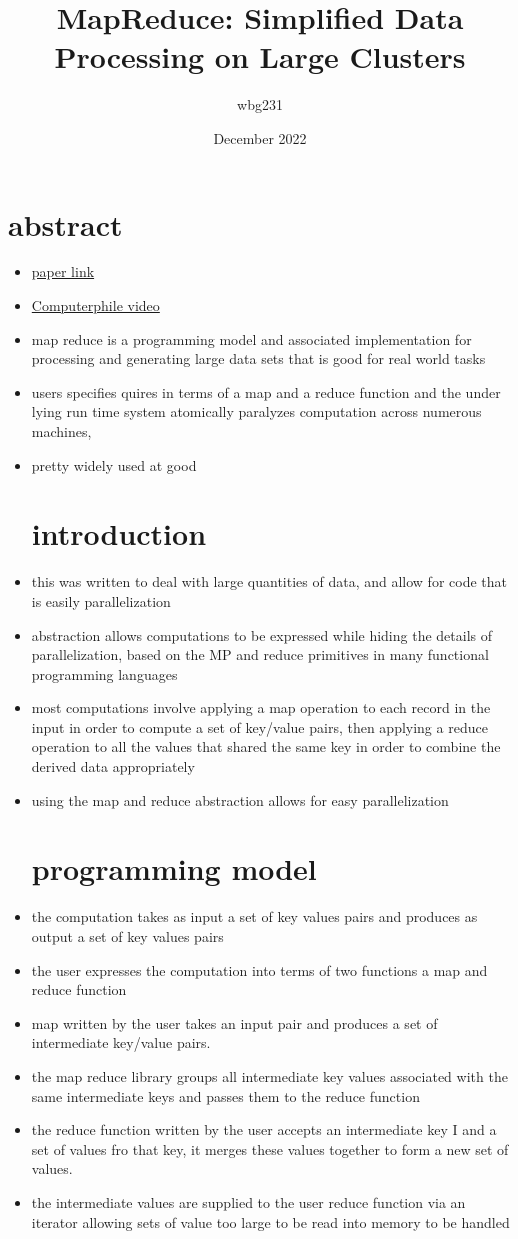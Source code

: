 \documentclass{article}
\title{MapReduce: Simplified Data Processing
on Large Clusters}
\author{wbg231 }
\date{December 2022}
\begin{document}
\maketitle

\section*{abstract}
\begin{itemize}
\item \href{https://brightspace.nyu.edu/content/enforced/261985-SP23_DS-GA_1004_1_001/p107-dean.pdf}{paper link}
\item \href{https://www.youtube.com/watch?v=cvhKoniK5Uo}{Computerphile video }
\item map reduce is a programming model and associated implementation for processing and generating large data sets that is good for real world tasks
\item users specifies quires in terms of a map and a reduce function and the under lying run time system atomically paralyzes computation across numerous machines, 
\item pretty widely used at good 
\section{introduction}
\item this was written to deal with large quantities of data, and allow for code that is easily parallelization 
\item abstraction allows computations to be expressed while hiding the details of parallelization, 
\imte based on the MP and reduce primitives in many functional programming languages
\item most computations involve applying a map operation to each record in the input in order to compute a set of key/value pairs, then applying a reduce operation to all the values that shared the same key in order to combine the derived data appropriately  
\item using the map and reduce abstraction allows for easy parallelization
\section{programming model}
\item the computation takes as input a set of key values pairs and produces as output a set of key values pairs
\item the user expresses the computation into terms of two functions a map and reduce function
\item map written by the user takes an input pair and produces a set of intermediate key/value pairs. 
\item the map reduce library groups all intermediate key values associated with the same intermediate keys and passes them to the reduce function 
\item the reduce function written by the user accepts an intermediate key I and a set of values fro that key, it merges these values together to form a new set of values. 
\item the intermediate values are supplied to the user reduce function via an iterator allowing sets of value too large to be read into memory to be handled 

\end{itemize}
\end{document}
